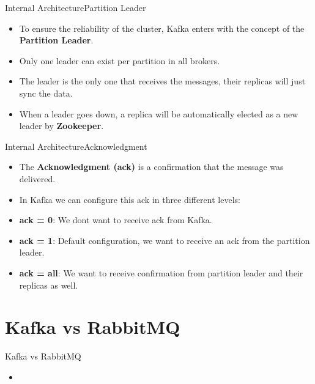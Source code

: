 \documentclass{beamer}
\begin{document}
\begin{frame}{Internal Architecture}{Partition Leader}
  \begin{itemize}
    \item To ensure the reliability of the cluster, Kafka enters with the concept of the \textbf{Partition Leader}.
    \item Only one leader can exist per partition in all brokers.
    \item The leader is the only one that receives the messages, their replicas will just sync the data.
    \item When a leader goes down, a replica will be automatically elected as a new leader by \textbf{Zookeeper}.
  \end{itemize}
\end{frame}

\begin{frame}{Internal Architecture}{Acknowledgment}
  \begin{itemize}
    \item The \textbf{Acknowledgment (ack)} is a confirmation that the message was delivered.
    \item In Kafka we can configure this ack in three different levels:
          \vspace*{1.2em}
    \item \textbf{ack = 0}: We dont want to receive ack from Kafka.
    \item \textbf{ack = 1}: Default configuration, we want to receive an ack from the partition leader.
    \item \textbf{ack = all}: We want to receive confirmation from partition leader and their replicas as well.
  \end{itemize}
\end{frame}


\section[Kafka vs RabbitMQ]{Kafka vs RabbitMQ}

\begin{frame}{Kafka vs RabbitMQ}
  \begin{itemize}
    \item
  \end{itemize}
\end{frame}
\end{document}
